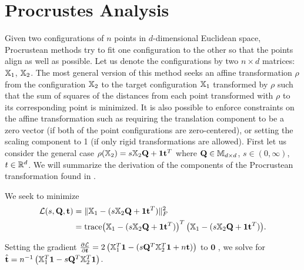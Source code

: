 \documentclass[12pt,oneside,final]{thesis}\usepackage[]{graphicx}\usepackage[]{color}
\begin{document}
\section{Procrustes Analysis}
Given two configurations of $n$ points in $d$-dimensional Euclidean space, Procrustean methods try to fit one configuration to the other so that the points align as well as possible. Let us denote the configurations by two $n \times d$ matrices: ${\mathbb{X}}_1$, ${\mathbb{X}}_2$. The most general version of this  method  seeks an affine transformation $\rho$ from the configuration ${\mathbb{X}}_2$  to the target configuration ${\mathbb{X}}_1$  transformed by $\rho$ such that the sum of squares of the distances from each point transformed with $\rho$ to its corresponding point is minimized.
It is also possible to  enforce constraints on the affine transformation such as requiring the translation component to be a zero vector (if both of the point configurations are zero-centered), or setting the scaling component to 1 (if only rigid transformations are allowed). First let us consider the general case  $\rho({{\mathbb{X}}_2}) = s{\mathbb{X}}_2\mathbf{Q}+\mbox{{\bf 1}}\mathbf{t}^T$ where $\mathbf{Q} \in \mathbb{M}_{d\times d}$, $s \in (0,\infty)$, $t\in \mathbb{R}^{d}$. We will summarize the derivation of the components of the Procrustean transformation found in \cite{borg+groenen:1997}.

We seek to  minimize 
\begin{align*}
\mathcal{L}(s,\mathbf{Q},\mathbf{t}) &= \|{\mathbb{X}}_1 - (s{\mathbb{X}}_2\mathbf{Q}+\mbox{{\bf 1}} \mathbf{t}^T)\|_F^2  
\\ &= \textup{trace} {\left({\mathbb{X}}_1 - (s{\mathbb{X}}_2\mathbf{Q}+\ensuremath{\mbox{{\bf 1}}} \mathbf{t}^T) \right)^T \left({\mathbb{X}}_1 - (s{\mathbb{X}}_2\mathbf{Q}+\ensuremath{\mbox{{\bf 1}}} \mathbf{t}^T) \right)}.
\end{align*}

Setting the gradient $\frac{\partial \mathcal{L}}{\partial \bm{t}}=2 \left({\mathbb{X}}_1^T \mbox{{\bf 1}} - (s\mathbf{Q}^T {\mathbb{X}}_2^T \mbox{{\bf 1}}+ n\mathbf{t})\right)$ to $\mathbf{0}$ ,
we solve for $\hat{\mathbf{t}}= n^{-1} \left({\mathbb{X}}_1^T \mbox{{\bf 1}}  -s\mathbf{Q}^T {\mathbb{X}}_2^T \mbox{{\bf 1}} \right)$. 
\end{document}
